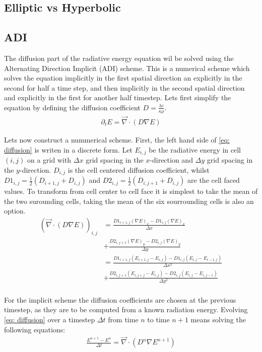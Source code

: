 \subsection{Elliptic vs Hyperbolic}
\subsection{ADI}
The diffusion part of the radiative energy equation wil be solved using the Alternating Direction Implicit (ADI) scheme. This is a numerical scheme which solves the equation implicitly in the first spatial direction an explicitly in the second for half a time step, and then implicitly in the second spatial direction and explicitly in the first for another half timestep. Lets first simplify the equation by defining the diffusion coefficient $D = \frac{\lambda c}{\kappa \rho}$. 
\begin{align}
\partial_t E  = \vec{\nabla} \cdot \left(D \nabla E\right) \label{eq: diffusion}
\end{align}

Lets now construct a nummerical scheme. First, the left hand side of \eqref{eq: diffusion} is writen in a discrete form. Let $E_{i,j}$ be the radiative energy in cell $(i,j)$ on a grid with $\Delta x$ grid spacing in the $x$-direction and $\Delta y$ grid spacing in the $y$-direction. $D_{i,j}$ is the cell centered diffusion coefficient, whilst $D1_{i,j} = \frac{1}{2} (D_{i+1,j} + D_{i,j})$ and $D2_{i,j} = \frac{1}{2} (D_{i,j+1} + D_{i,j})$ are the cell faced values. To transform from cell center to cell face it is simplest to take the mean of the two surounding cells, taking the mean of the six sourrounding cells is also an option. 
\begin{align}
\left( \vec{\nabla} \cdot \left(D \nabla E\right) \right)_{i,j} 
 &= \frac{D1_{i+1,j} (\nabla E)_{x} - D1_{i,j} (\nabla E)_{x}}{\Delta x} \\
 &+ \frac{D2_{i,j+1} (\nabla E)_{y} - D2_{i,j} (\nabla E)_{y}}{\Delta y} \\ 
 &= \frac{D1_{i+1,j} (E_{i+1,j} - E_{i,j}) - D1_{i,j} (E_{i,j} - E_{i-1,j})}{\Delta x^2} \\
 &+ \frac{D2_{i,j+1} (E_{i,j+j} - E_{i,j}) - D2_{i,j} (E_{i,j} - E_{i,j-1})}{\Delta y^2} \\ 
\end{align}

For the implicit scheme the diffusion coefficients are chosen at the previous timestep, as they are to be computed from a known radiation energy. Evolving \eqref{eq: diffusion} over a timestep $\Delta t$ from time $n$ to time $n+1$ means solving the following equations:
\begin{align}
\frac{E^{n+1} - E^{n}}{\Delta t} = \vec{\nabla} \cdot \left(D^n \nabla E^{n+1}\right) 
\end{align}

